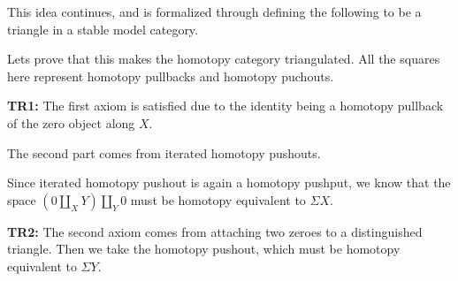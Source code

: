 This idea continues, 
and is formalized through defining the following to be a triangle in a stable model category. 

\begin{center}
\end{center}

Lets prove that this makes the homotopy category triangulated. 
All the squares here represent homotopy pullbacks and homotopy puchouts. 

\textbf{TR1:} The first axiom is satisfied due to the identity being a homotopy pullback of the zero object along $X$.  

\begin{center}
\end{center}

The second part comes from iterated homotopy pushouts. 

\begin{center}
\end{center}

Since iterated homotopy pushout is again a homotopy pushput, 
we know that the space $ (0\coprod_X Y)\coprod_Y 0 $ must be homotopy equivalent to $\Sigma X$. 

\textbf{TR2:} The second axiom comes from attaching two zeroes to a distinguished triangle. 
Then we take the homotopy pushout, 
which must be homotopy equivalent to $\Sigma Y$.

\begin{center}
\end{center}

